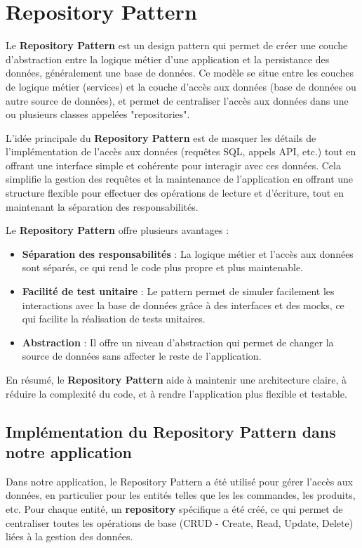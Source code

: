 \chapter{Repository Pattern}


Le \textbf{Repository Pattern} est un design pattern qui permet de créer une couche d’abstraction entre la logique métier d'une application et la persistance des données, généralement une base de données. Ce modèle se situe entre les couches de logique métier (services) et la couche d’accès aux données (base de données ou autre source de données), et permet de centraliser l’accès aux données dans une ou plusieurs classes appelées "repositories".

L’idée principale du \textbf{Repository Pattern} est de masquer les détails de l’implémentation de l’accès aux données (requêtes SQL, appels API, etc.) tout en offrant une interface simple et cohérente pour interagir avec ces données. Cela simplifie la gestion des requêtes et la maintenance de l’application en offrant une structure flexible pour effectuer des opérations de lecture et d’écriture, tout en maintenant la séparation des responsabilités.

Le \textbf{Repository Pattern} offre plusieurs avantages :
\begin{itemize}
    \item \textbf{Séparation des responsabilités} : La logique métier et l’accès aux données sont séparés, ce qui rend le code plus propre et plus maintenable.
    \item \textbf{Facilité de test unitaire} : Le pattern permet de simuler facilement les interactions avec la base de données grâce à des interfaces et des mocks, ce qui facilite la réalisation de tests unitaires.
    \item \textbf{Abstraction} : Il offre un niveau d'abstraction qui permet de changer la source de données sans affecter le reste de l’application.
\end{itemize}

En résumé, le \textbf{Repository Pattern} aide à maintenir une architecture claire, à réduire la complexité du code, et à rendre l’application plus flexible et testable.

\section{Implémentation du Repository Pattern dans notre application}

Dans notre application, le Repository Pattern a été utilisé pour gérer l’accès aux données, en particulier pour les entités telles que les les commandes, les produits, etc. Pour chaque entité, un \textbf{repository} spécifique a été créé, ce qui permet de centraliser toutes les opérations de base (CRUD - Create, Read, Update, Delete) liées à la gestion des données.

